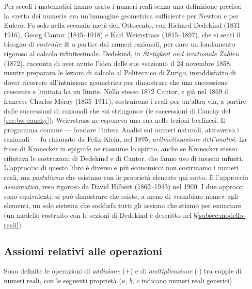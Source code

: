 \begin{notastorica}
Per secoli i matematici hanno usato i numeri reali senza una definizione precisa: la
«retta dei numeri» era un'immagine geometrica sufficiente per Newton e per Eulero. Fu
solo nella seconda metà dell'Ottocento, con Richard Dedekind (1831--1916), Georg Cantor
(1845--1918) e Karl Weierstrass (1815--1897), che si sentì il bisogno di \emph{costruire}
$\mathbb{R}$ a partire dai numeri razionali, per dare un fondamento rigoroso al calcolo
infinitesimale. Dedekind, in \emph{Stetigkeit und irrationale Zahlen} (1872), racconta di
aver avuto l'idea delle sue «sezioni» il 24 novembre 1858, mentre preparava le lezioni
di calcolo al Politecnico di Zurigo, insoddisfatto di dover ricorrere all'intuizione
geometrica per dimostrare che una successione crescente e limitata ha un limite.
Nello stesso 1872 Cantor, e già nel 1869 il francese Charles Méray (1835--1911),
costruirono i reali per un'altra via, a partire dalle successioni di razionali che «si
stringono» (le successioni di Cauchy del \cref{sec:bw-cauchy}); Weierstrass ne esponeva
una sua nelle lezioni berlinesi. Il programma comune --- fondare l'intera Analisi sui
numeri naturali, attraverso i razionali --- fu chiamato da Felix Klein, nel 1895,
\emph{aritmetizzazione dell'analisi}. La frase di Kronecker in epigrafe ne riassume lo
spirito, anche se Kronecker stesso rifiutava le costruzioni di Dedekind e di Cantor,
che fanno uso di insiemi infiniti.
L'approccio di questo libro è diverso e più economico: non costruiamo i numeri reali,
ma \emph{postuliamo} che esistano con le proprietà elencate qui sotto. È l'approccio
\emph{assiomatico}, reso rigoroso da David Hilbert (1862--1943) nel 1900. I due approcci
sono equivalenti: si può dimostrare che esiste, a meno di «cambiare nome» agli elementi,
un solo sistema che soddisfa tutti gli assiomi che stiamo per enunciare (un modello
costruito con le sezioni di Dedekind è descritto nel \S\ref{subsec:modello-reali}).
\end{notastorica}

\subsection{Assiomi relativi alle operazioni}

Sono definite le operazioni di \emph{addizione} ($+$) e di \emph{moltiplicazione}
($\cdot$) tra coppie di numeri reali, con le seguenti proprietà ($a$, $b$, $c$ indicano
numeri reali generici).

